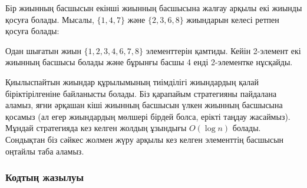 Бір жиынның басшысын екінші жиынның басшысына 
жалғау арқылы екі жиынды қосуға болады.
Мысалы, $\{1,4,7\}$ және $\{2,3,6,8\}$ жиындарын
келесі ретпен қосуға болады:
\begin{center}
\end{center}

Одан шығатын жиын $\{1,2,3,4,6,7,8\}$
элементтерін қамтиды.
Кейін 2-элемент екі жиынның басшысы болады және
бұрынғы басшы 4 енді 2-элементке нұсқайды.

Қиылыспайтын жиындар құрылымының тиімділігі жиындардың қалай біріктірілгеніне байланысты болады. Біз қарапайым стратегияны пайдалана аламыз, яғни әрқашан кіші жиынның басшысын үлкен жиынның басшысына қосамыз (ал егер  
жиындардың мөлшері бірдей болса, ерікті таңдау жасаймыз).
Мұндай стратегияда кез келген жолдың ұзындығы 
$O(\log n)$ болады. Сондықтан біз сәйкес жолмен жүру арқылы кез келген элементтің басшысын оңтайлы таба аламыз.

\subsubsection{Кодтың жазылуы}

